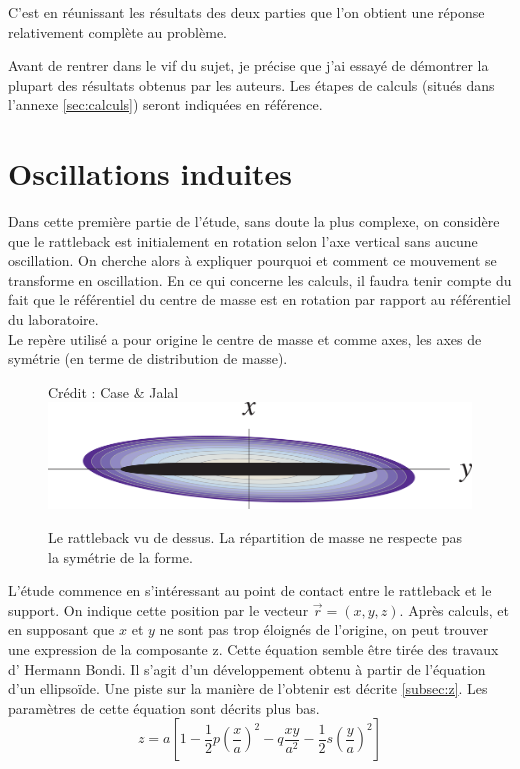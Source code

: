 \documentclass[12pt,a4paper]{article}
\begin{document}
	C'est en réunissant les résultats des deux parties que l'on obtient une réponse relativement complète au problème.
	
	Avant de rentrer dans le vif du sujet, je précise que j'ai essayé de démontrer la plupart des résultats obtenus par les auteurs. Les étapes de calculs (situés dans l'annexe \ref{sec:calculs}) seront indiquées en référence.
	\section{Oscillations induites}
	Dans cette première partie de l'étude, sans doute la plus complexe, on considère que le rattleback est initialement en rotation selon l'axe vertical sans aucune oscillation. On cherche alors à expliquer pourquoi et comment ce mouvement se transforme en oscillation.
	En ce qui concerne les calculs, il faudra tenir compte du fait que le référentiel du centre de masse est en rotation par rapport au référentiel du laboratoire.\\
	Le repère utilisé a pour origine le centre de masse et comme axes, les axes de symétrie (en terme de distribution de masse).\nopagebreak
	\begin{figure}[h]
		\centering
		\caption{Le rattleback vu de dessus. La répartition de masse ne respecte pas la symétrie de la forme.}{Crédit : Case \& Jalal}
		\label{fig:mass-repartition}
		\includegraphics[width=0.7\linewidth]{"mass repartition"}
	\end{figure}
	
	L'étude commence en s'intéressant au point de contact entre le rattleback et le support. On indique cette position par le vecteur $\vec{r}=(x,y,z)$. Après calculs, et en supposant que $x$ et $y$ ne sont pas trop éloignés de l'origine, on peut trouver une expression de la composante z.
	Cette équation semble être tirée des travaux d' Hermann Bondi. Il s'agit d'un développement obtenu à partir de l'équation d'un ellipsoïde. Une piste sur la manière de l'obtenir est décrite \autoref{subsec:z}. Les paramètres de cette équation sont décrits plus bas.
	\begin{equation}
	z=a\left[ 1-\dfrac {1} {2}p\left( \dfrac {x} {a}\right) ^{2}-q\dfrac {xy} {a^{2}}-\dfrac {1} {2}s\left( \dfrac {y} {a}\right) ^{2}\right]
	\label{eq:z}
	\end{equation}
	
\end{document}
